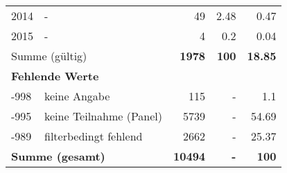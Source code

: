 \begin{longtable}{lXrrr}
     2014 &
     \multicolumn{1}{X}{ -  } &


       \num{49} &
       \num[round-mode=places,round-precision=2]{2.48} &
         \num[round-mode=places,round-precision=2]{0.47} \\

     2015 &
     \multicolumn{1}{X}{ -  } &


       \num{4} &
       \num[round-mode=places,round-precision=2]{0.2} &
         \num[round-mode=places,round-precision=2]{0.04} \\
     \midrule
     \multicolumn{2}{l}{Summe (gültig)} &
       \textbf{\num{1978}} &
     \textbf{\num{100}} &
       \textbf{\num[round-mode=places,round-precision=2]{18.85}} \\
     \multicolumn{5}{l}{\textbf{Fehlende Werte}}\\
       -998 &
       keine Angabe &
         \num{115} &
        - &
         \num[round-mode=places,round-precision=2]{1.1} \\
       -995 &
       keine Teilnahme (Panel) &
         \num{5739} &
        - &
         \num[round-mode=places,round-precision=2]{54.69} \\
       -989 &
       filterbedingt fehlend &
         \num{2662} &
        - &
         \num[round-mode=places,round-precision=2]{25.37} \\
     \midrule
     \multicolumn{2}{l}{\textbf{Summe (gesamt)}} &
          \textbf{\num{10494}} &
        \textbf{-} &
        \textbf{\num{100}} \\
     \bottomrule
     \end{longtable}
     
